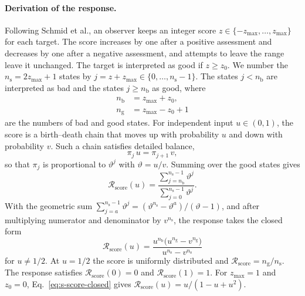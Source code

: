 \documentclass[10pt]{wlscirep}
\newcommand{\Rmap}{\mathscr{R}}            %
\theoremstyle{plain}
\theoremstyle{remark}
\begin{document}
\paragraph{Derivation of the response.} Following Schmid et al., an observer keeps an integer score $z\in\{-z_{\max},\ldots,z_{\max}\}$ for each target. The score increases by one after a positive assessment and decreases by one after a negative assessment, and attempts to leave the range leave it unchanged. The target is interpreted as good if $z\geq z_0$. We number the $n_{\mathrm s}=2z_{\max}+1$ states by $j=z+z_{\max}\in\{0,\ldots,n_{\mathrm s}-1\}$. The states $j<n_{\mathrm b}$ are interpreted as bad and the states $j\geq n_{\mathrm b}$ as good, where
\begin{equation}
\begin{aligned}
n_{\mathrm b}&=z_{\max}+z_0,\\
n_{\mathrm g}&=z_{\max}-z_0+1
\end{aligned}
\label{eq:s-score-counts}
\end{equation}
are the numbers of bad and good states. For independent input $u\in(0,1)$, the score is a birth--death chain that moves up with probability $u$ and down with probability $v$. Such a chain satisfies detailed balance,
\begin{equation}
\pi_j\,u=\pi_{j+1}\,v,
\label{eq:s-score-balance}
\end{equation}
so that $\pi_j$ is proportional to $\vartheta^j$ with $\vartheta=u/v$. Summing over the good states gives
\begin{equation}
\Rmap_{\mathrm{score}}(u)=\frac{\sum_{j=n_{\mathrm b}}^{n_{\mathrm s}-1}\vartheta^j}{\sum_{j=0}^{n_{\mathrm s}-1}\vartheta^j}.
\label{eq:s-score}
\end{equation}
With the geometric sum $\sum_{j=a}^{n_{\mathrm s}-1}\vartheta^j=(\vartheta^{n_{\mathrm s}}-\vartheta^a)/(\vartheta-1)$, and after multiplying numerator and denominator by $v^{n_{\mathrm s}}$, the response takes the closed form
\begin{equation}
\Rmap_{\mathrm{score}}(u)=\frac{u^{n_{\mathrm b}}\bigl(u^{n_{\mathrm g}}-v^{n_{\mathrm g}}\bigr)}{u^{n_{\mathrm s}}-v^{n_{\mathrm s}}}
\label{eq:s-score-closed}
\end{equation}
for $u\neq1/2$. At $u=1/2$ the score is uniformly distributed and $\Rmap_{\mathrm{score}}=n_{\mathrm g}/n_{\mathrm s}$. The response satisfies $\Rmap_{\mathrm{score}}(0)=0$ and $\Rmap_{\mathrm{score}}(1)=1$. For $z_{\max}=1$ and $z_0=0$, Eq.~\eqref{eq:s-score-closed} gives $\Rmap_{\mathrm{score}}(u)=u/(1-u+u^2)$.
\end{document}
